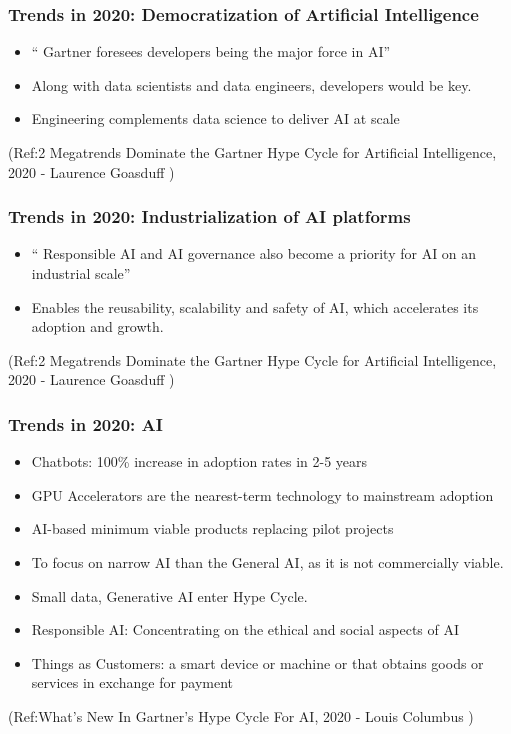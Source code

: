 \begin{frame}[fragile]\frametitle{Trends in 2020: Democratization of Artificial Intelligence}

\begin{itemize}
\item `` Gartner foresees developers being the major force in AI''
\item Along with data scientists and data engineers, developers would be key.
\item Engineering complements data science to deliver AI at scale
\end{itemize}


{\tiny (Ref:2 Megatrends Dominate the Gartner Hype Cycle for Artificial Intelligence, 2020 - Laurence Goasduff )}

\end{frame}

\begin{frame}[fragile]\frametitle{Trends in 2020: Industrialization of AI platforms
}

\begin{itemize}
\item `` Responsible AI and AI governance also become a priority for AI on an industrial scale''
\item Enables the reusability, scalability and safety of AI, which accelerates its adoption and growth.
\end{itemize}


{\tiny (Ref:2 Megatrends Dominate the Gartner Hype Cycle for Artificial Intelligence, 2020 - Laurence Goasduff )}

\end{frame}

\begin{frame}[fragile]\frametitle{Trends in 2020: AI}

\begin{itemize}
\item Chatbots: 100\% increase in adoption rates in 2-5 years
\item GPU Accelerators are the nearest-term technology to mainstream adoption
\item AI-based minimum viable products replacing pilot projects 
\item To focus on narrow AI than the General AI, as it is not commercially viable.
\item Small data, Generative AI  enter Hype Cycle.
\item Responsible AI: Concentrating on the ethical and social aspects of AI
\item Things as Customers: a smart device or machine or that obtains goods or services in exchange for payment
\end{itemize}


{\tiny (Ref:What’s New In Gartner’s Hype Cycle For AI, 2020 - 
Louis Columbus )}

\end{frame}

